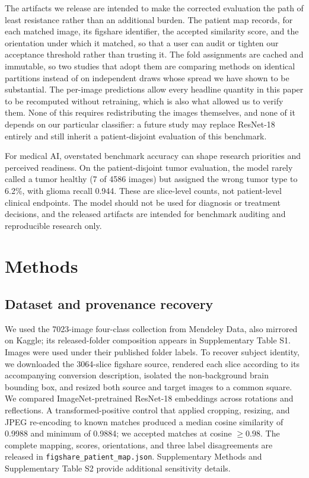 ﻿\documentclass[11pt]{article}
\begin{document}
The artifacts we release are intended to make the corrected evaluation the path of least resistance rather than an additional burden. The patient map records, for each matched image, its figshare identifier, the accepted similarity score, and the orientation under which it matched, so that a user can audit or tighten our acceptance threshold rather than trusting it. The fold assignments are cached and immutable, so two studies that adopt them are comparing methods on identical partitions instead of on independent draws whose spread we have shown to be substantial. The per-image predictions allow every headline quantity in this paper to be recomputed without retraining, which is also what allowed us to verify them. None of this requires redistributing the images themselves, and none of it depends on our particular classifier: a future study may replace ResNet-18 entirely and still inherit a patient-disjoint evaluation of this benchmark.

For medical AI, overstated benchmark accuracy can shape research priorities and perceived readiness. On the patient-disjoint tumor evaluation, the model rarely called a tumor healthy (7 of 4586 images) but assigned the wrong tumor type to 6.2\%, with glioma recall 0.944. These are slice-level counts, not patient-level clinical endpoints. The model should not be used for diagnosis or treatment decisions, and the released artifacts are intended for benchmark auditing and reproducible research only.

\section{Methods}
\subsection{Dataset and provenance recovery}
We used the 7023-image four-class collection from Mendeley Data\cite{ghaffar2024dataset}, also mirrored on Kaggle\cite{nickparvar2021dataset}; its released-folder composition appears in Supplementary Table S1. Images were used under their published folder labels. To recover subject identity, we downloaded the 3064-slice figshare source\cite{cheng2015enhanced}, rendered each slice according to its accompanying conversion description, isolated the non-background brain bounding box, and resized both source and target images to a common square. We compared ImageNet-pretrained ResNet-18 embeddings across rotations and reflections. A transformed-positive control that applied cropping, resizing, and JPEG re-encoding to known matches produced a median cosine similarity of 0.9988 and minimum of 0.9884; we accepted matches at cosine $\geq0.98$. The complete mapping, scores, orientations, and three label disagreements are released in \texttt{figshare\_patient\_map.json}. Supplementary Methods and Supplementary Table S2 provide additional sensitivity details.
\end{document}
